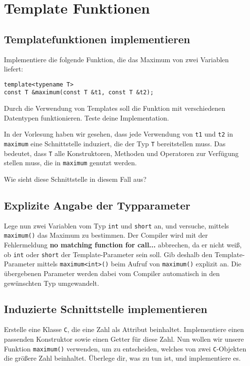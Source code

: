 \section{Template Funktionen}
\subsection{Templatefunktionen implementieren}
Implementiere die folgende Funktion, die das Maximum von zwei Variablen liefert:

\begin{lstlisting}
template<typename T>
const T &maximum(const T &t1, const T &t2);
\end{lstlisting}

Durch die Verwendung von Templates soll die Funktion mit verschiedenen Datentypen funktionieren.
Teste deine Implementation.

In der Vorlesung haben wir gesehen, dass jede Verwendung von \texttt{t1} und \texttt{t2} in \texttt{maximum} eine Schnittstelle induziert, die der Typ \texttt{T} bereitstellen muss.
Das bedeutet, dass \texttt{T} alle Konstruktoren, Methoden und Operatoren zur Verfügung stellen muss, die in \texttt{maximum} genutzt werden.

Wie sieht diese Schnittstelle in diesem Fall aus?


\subsection{Explizite Angabe der Typparameter}
Lege nun zwei Variablen vom Typ \texttt{int} und \texttt{short} an, und versuche, mittels \texttt{maximum()} das Maximum zu bestimmen.
Der Compiler wird mit der Fehlermeldung \textbf{no matching function for call...} abbrechen, da er nicht weiß, ob \texttt{int} oder \texttt{short} der Template-Parameter sein soll.
Gib deshalb den Template-Parameter mittels \texttt{maximum<int>()} beim Aufruf von \texttt{maximum()} explizit an.
Die übergebenen Parameter werden dabei vom Compiler automatisch in den gewünschten Typ umgewandelt.

\subsection{Induzierte Schnittstelle implementieren}
Erstelle eine Klasse \texttt{C}, die eine Zahl als Attribut beinhaltet. Implementiere einen passenden Konstruktor sowie einen Getter für diese Zahl. Nun wollen wir unsere Funktion  \texttt{maximum()} verwenden, um zu entscheiden, welches von zwei \texttt{C}-Objekten die größere Zahl beinhaltet.
Überlege dir, was zu tun ist, und implementiere es.

